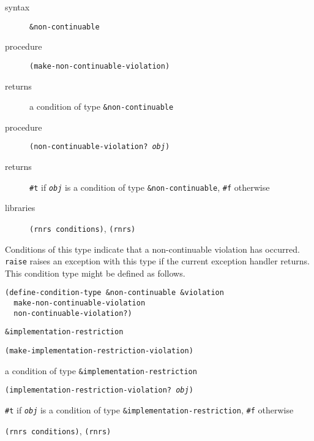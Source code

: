 \begin{description}

\label{exceptions_s27}\item[syntax] \texttt{\&{}non-continuable}



\item[procedure] \texttt{(make-non-continuable-violation)}



\item[returns] a condition of type \texttt{\&{}non-continuable}


\item[procedure] \texttt{(non-continuable-violation? \textit{obj})}



\item[returns] \texttt{\#{}t} if \texttt{\textit{obj}} is a condition of type \texttt{\&{}non-continuable}, \texttt{\#{}f} otherwise


\item[libraries] \texttt{(rnrs conditions)}, \texttt{(rnrs)}
\end{description}



Conditions of this type indicate that a non-continuable violation has occurred.
\texttt{raise} raises an exception with this type if the current exception
handler returns.
This condition type might be defined as follows.

\begin{alltt}
(define-condition-type \&{}non-continuable \&{}violation
  make-non-continuable-violation
  non-continuable-violation?)
\end{alltt}

\begin{description}

\label{exceptions_s28}\item[syntax] \texttt{\&{}implementation-restriction}



\item[procedure] \texttt{(make-implementation-restriction-violation)}



\item[returns] a condition of type \texttt{\&{}implementation-restriction}


\item[procedure] \texttt{(implementation-restriction-violation? \textit{obj})}



\item[returns] \texttt{\#{}t} if \texttt{\textit{obj}} is a condition of type \texttt{\&{}implementation-restriction}, \texttt{\#{}f} otherwise


\item[libraries] \texttt{(rnrs conditions)}, \texttt{(rnrs)}
\end{description}



